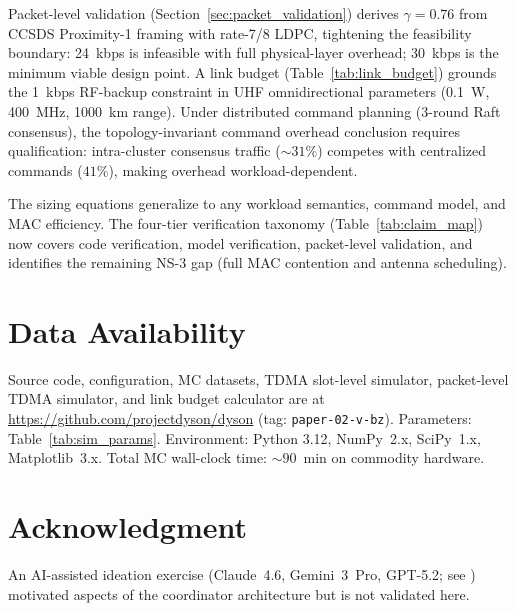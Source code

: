 \documentclass[journal]{IEEEtran}
\begin{document}
Packet-level validation (Section~\ref{sec:packet_validation}) derives $\gamma = 0.76$ from CCSDS Proximity-1 framing with rate-7/8 LDPC, tightening the feasibility boundary: 24~kbps is infeasible with full physical-layer overhead; 30~kbps is the minimum viable design point. A link budget (Table~\ref{tab:link_budget}) grounds the 1~kbps RF-backup constraint in UHF omnidirectional parameters (0.1~W, 400~MHz, 1000~km range). Under distributed command planning (3-round Raft consensus), the topology-invariant command overhead conclusion requires qualification: intra-cluster consensus traffic (${\sim}31\%$) competes with centralized commands ($41\%$), making overhead workload-dependent.

The sizing equations generalize to any workload semantics, command model, and MAC efficiency. The four-tier verification taxonomy (Table~\ref{tab:claim_map}) now covers code verification, model verification, packet-level validation, and identifies the remaining NS-3 gap (full MAC contention and antenna scheduling).

\section*{Data Availability}

Source code, configuration, MC datasets, TDMA slot-level simulator, packet-level TDMA simulator, and link budget calculator are at \url{https://github.com/projectdyson/dyson} (tag: \texttt{paper-02-v-bz}). Parameters: Table~\ref{tab:sim_params}. Environment: Python 3.12, NumPy~2.x, SciPy~1.x, Matplotlib~3.x. Total MC wall-clock time: ${\sim}90$~min on commodity hardware.

\section*{Acknowledgment}

An AI-assisted ideation exercise (Claude~4.6, Gemini~3~Pro, GPT-5.2; see \cite{dyson_multimodel}) motivated aspects of the coordinator architecture but is not validated here.
\end{document}
